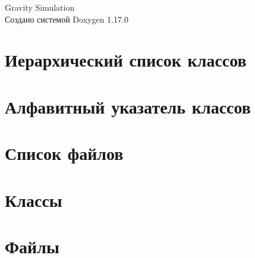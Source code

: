 \documentclass[twoside]{book}
\newcommand{\+}{\discretionary{\mbox{\scriptsize$\hookleftarrow$}}{}{}}
\newcommand{\clearemptydoublepage}{%
    \newpage{\pagestyle{empty}\cleardoublepage}%
  }
\begin{document}
  \raggedbottom
    \hypersetup{pageanchor=false,
                bookmarksnumbered=true,
                pdfencoding=unicode
               }
  \begin{titlepage}
  \vspace*{7cm}
  \begin{center}%
  {\Large Gravity Simulation}\\
  \vspace*{1cm}
  {\large Создано системой Doxygen 1.17.0}\\
  \end{center}
  \end{titlepage}
  \clearemptydoublepage
  \tableofcontents
  \clearemptydoublepage
  \hypersetup{pageanchor=true}

\chapter{Иерархический список классов}

\chapter{Алфавитный указатель классов}

\chapter{Список файлов}

\chapter{Классы}








\chapter{Файлы}















  \backmatter
  \newpage
  \clearemptydoublepage
  \printindex
\end{document}
